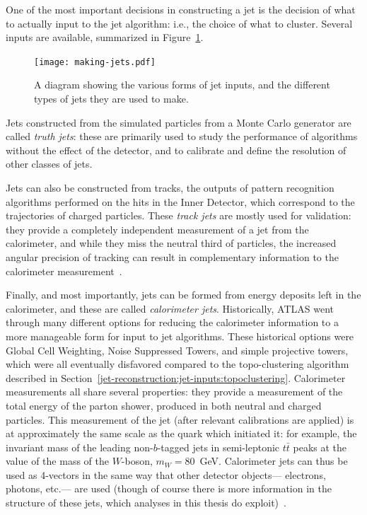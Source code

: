 One of the most important decisions in constructing a jet is the decision of what to actually input to the jet algorithm: i.e., the choice of what to cluster. Several inputs are available, summarized in Figure~\ref{fig:jet-reconstruction:making-jets}. 


\begin{figure}
\centering
\texttt{[image: making-jets.pdf]}
\caption{A diagram showing the various forms of jet inputs, and the different types of jets they are used to make.}
\label{fig:jet-reconstruction:making-jets}
\end{figure}


Jets constructed from the simulated particles from a Monte Carlo generator are called \textit{truth jets}: these are primarily used to study the performance of algorithms without the effect of the detector, and to calibrate and define the resolution of other classes of jets. 

Jets can also be constructed from tracks, the outputs of pattern recognition algorithms performed on the hits in the Inner Detector, which correspond to the trajectories of charged particles. These \textit{track jets} are mostly used for validation: they provide a completely independent measurement of a jet from the calorimeter, and while they miss the neutral third of particles, the increased angular precision of tracking can result in complementary information to the calorimeter measurement~\cite{Zenz:1374663,ATLAS-SS-2011}.

Finally, and most importantly, jets can be formed from energy deposits left in the calorimeter, and these are called \textit{calorimeter jets}. Historically, ATLAS went through many different options for reducing the calorimeter information to a more manageable form for input to jet algorithms. These historical options were Global Cell Weighting, Noise Suppressed Towers, and simple projective towers, which were all eventually disfavored compared to the topo-clustering algorithm described in Section~\ref{jet-reconstruction:jet-inputs:topoclustering}. Calorimeter measurements all share several properties: they provide a measurement of the total energy of the parton shower, produced in both neutral and charged particles. This measurement of the jet (after relevant calibrations are applied) is at approximately the same scale as the quark which initiated it: for example, the invariant mass of the leading non-$b$-tagged jets in semi-leptonic $t\bar{t}$ peaks at the value of the mass of the $W$-boson, $m_{W} = 80$~GeV. Calorimeter jets can thus be used as 4-vectors in the same way that other detector objects--- electrons, photons, etc.--- are used (though of course there is more information in the structure of these jets, which analyses in this thesis do exploit)~\cite{JES2010,Aad:2012vm}. 

